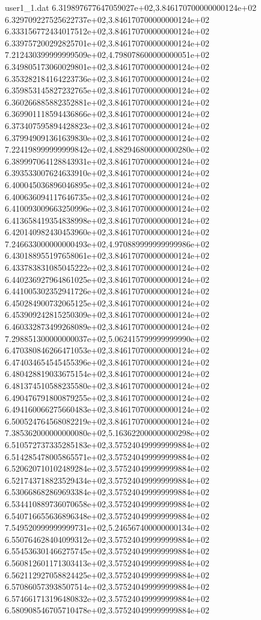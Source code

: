 \begin{filecontents}{user1_1.dat}
6.319897677647059027e+02,3.846170700000000124e+02
6.329709227525622737e+02,3.846170700000000124e+02
6.333156772434017512e+02,3.846170700000000124e+02
6.339757200292825701e+02,3.846170700000000124e+02
7.212430399999999509e+02,4.798078600000000051e+02
6.349805173060029801e+02,3.846170700000000124e+02
6.353282184164223736e+02,3.846170700000000124e+02
6.359853145827232765e+02,3.846170700000000124e+02
6.360266885882352881e+02,3.846170700000000124e+02
6.369901118594436866e+02,3.846170700000000124e+02
6.373407595894428823e+02,3.846170700000000124e+02
6.379949091361639830e+02,3.846170700000000124e+02
7.224198999999999842e+02,4.882946800000000280e+02
6.389997064128843931e+02,3.846170700000000124e+02
6.393533007624633910e+02,3.846170700000000124e+02
6.400045036896046895e+02,3.846170700000000124e+02
6.400636094117646735e+02,3.846170700000000124e+02
6.410093009663250996e+02,3.846170700000000124e+02
6.413658419354838998e+02,3.846170700000000124e+02
6.420140982430453960e+02,3.846170700000000124e+02
7.246633000000000493e+02,4.970889999999999986e+02
6.430188955197658061e+02,3.846170700000000124e+02
6.433783831085045222e+02,3.846170700000000124e+02
6.440236927964861025e+02,3.846170700000000124e+02
6.441005302352941726e+02,3.846170700000000124e+02
6.450284900732065125e+02,3.846170700000000124e+02
6.453909242815250309e+02,3.846170700000000124e+02
6.460332873499268089e+02,3.846170700000000124e+02
7.298851300000000037e+02,5.062415799999999990e+02
6.470380846266471053e+02,3.846170700000000124e+02
6.474034654545455396e+02,3.846170700000000124e+02
6.480428819033675154e+02,3.846170700000000124e+02
6.481374510588235580e+02,3.846170700000000124e+02
6.490476791800879255e+02,3.846170700000000124e+02
6.494160066275660483e+02,3.846170700000000124e+02
6.500524764568082219e+02,3.846170700000000124e+02
7.385362000000000080e+02,5.163622000000000298e+02
6.510572737335285183e+02,3.575240499999999884e+02
6.514285478005865571e+02,3.575240499999999884e+02
6.520620710102489284e+02,3.575240499999999884e+02
6.521743718823529434e+02,3.575240499999999884e+02
6.530668682869693384e+02,3.575240499999999884e+02
6.534410889736070658e+02,3.575240499999999884e+02
6.540716655636896348e+02,3.575240499999999884e+02
7.549520999999999731e+02,5.246567400000000134e+02
6.550764628404099312e+02,3.575240499999999884e+02
6.554536301466275745e+02,3.575240499999999884e+02
6.560812601171303413e+02,3.575240499999999884e+02
6.562112927058824425e+02,3.575240499999999884e+02
6.570860573938507514e+02,3.575240499999999884e+02
6.574661713196480832e+02,3.575240499999999884e+02
6.580908546705710478e+02,3.575240499999999884e+02

\end{filecontents}
